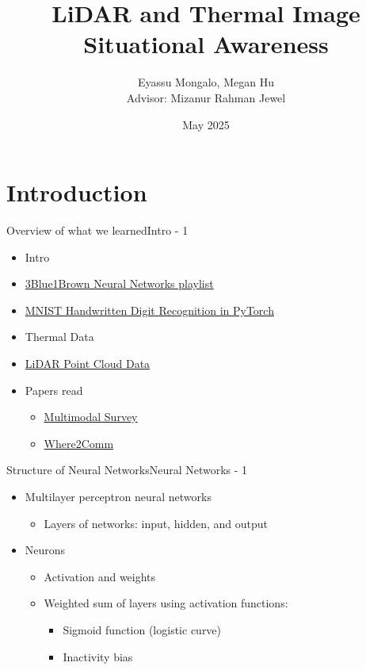 \documentclass{beamer}
\title{LiDAR and Thermal Image Situational Awareness}
\author{\texorpdfstring{Eyassu Mongalo, Megan Hu \\ \small Advisor: Mizanur Rahman Jewel}
    {Eyassu Mongalo, Megan Hu, Advisor: Mizanur Rahman Jewel}}
\date{May 2025}
\begin{document}
\maketitle
\section{Introduction}

\begin{frame}{Overview of what we learned}{Intro - 1}
\begin{itemize}
    \item Intro
    \item \href{https://www.youtube.com/playlist?list=PLZHQObOWTQDNU6R1_67000Dx_ZCJB-3pi}{3Blue1Brown Neural Networks playlist}
    \item \href{https://nextjournal.com/gkoehler/pytorch-mnist}{MNIST Handwritten Digit Recognition in PyTorch}
    \item Thermal Data
    \item \href{https://www.faro.com/en/Resource-Library/Article/Point-Clouds-for-Beginners}{LiDAR Point Cloud Data}
    \item Papers read
    \begin{itemize}
        \item \href{https://ieeexplore.ieee.org/stamp/stamp.jsp?arnumber=10123038}{Multimodal Survey}
        \item \href{https://proceedings.neurips.cc/paper_files/paper/2022/file/1f5c5cd01b864d53cc5fa0a3472e152e-Paper-Conference.pdf}{Where2Comm}
    \end{itemize}
\end{itemize}
\end{frame}

\begin{frame}{Structure of Neural Networks}{Neural Networks - 1}
\begin{itemize}
    \item Multilayer perceptron neural networks 
    \begin{itemize}
        \item Layers of networks: input, hidden, and output
    \end{itemize}
    
    \item Neurons 
    \begin{itemize}
        \item Activation and weights
        \item Weighted sum of layers using activation functions:
        \begin{itemize}
            \item Sigmoid function (logistic curve)
            \item Inactivity bias
        \end{itemize}
    \end{itemize}
\end{itemize}
\end{frame}
\end{document}
